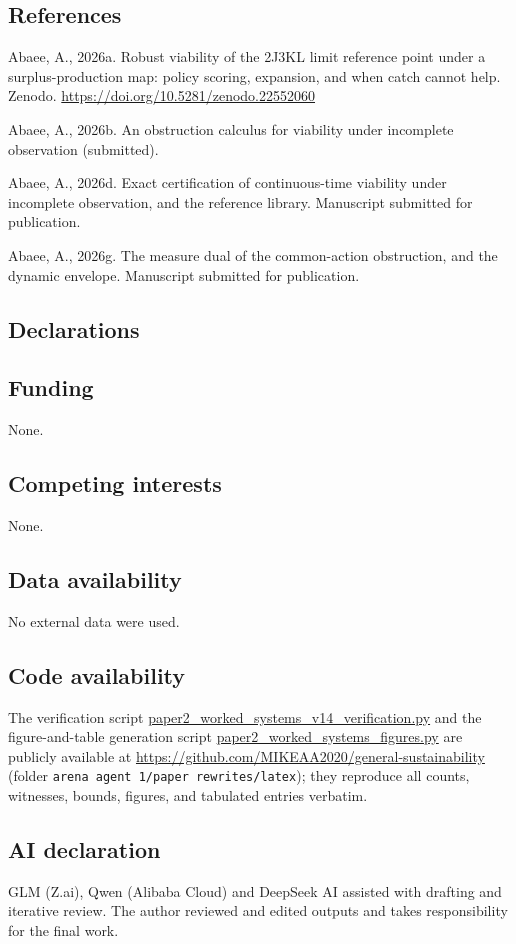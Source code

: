 \documentclass[10pt,twocolumn]{article}
\theoremstyle{definition}
\begin{document}
\subsection*{References}

Abaee, A., 2026a. Robust viability of the 2J3KL limit reference point
under a surplus-production map: policy scoring, expansion, and when
catch cannot help. Zenodo.
\url{https://doi.org/10.5281/zenodo.22552060}

Abaee, A., 2026b. An obstruction calculus for viability under
incomplete observation (submitted).

Abaee, A., 2026d. Exact certification of continuous-time viability under
incomplete observation, and the reference library. Manuscript submitted
for publication.

Abaee, A., 2026g. The measure dual of the common-action obstruction, and
the dynamic envelope. Manuscript submitted for publication.

\subsection*{Declarations}

\subsection*{Funding}
None.

\subsection*{Competing interests}
None.

\subsection*{Data availability}
No external data were used.

\subsection*{Code availability}
The verification script \url{paper2_worked_systems_v14_verification.py}
and the figure-and-table generation script
\url{paper2_worked_systems_figures.py} are publicly available at
\url{https://github.com/MIKEAA2020/general-sustainability} (folder
\texttt{arena agent 1/paper rewrites/latex}); they reproduce all
counts, witnesses, bounds, figures, and tabulated entries verbatim.

\subsection*{AI declaration}
GLM (Z.ai), Qwen (Alibaba Cloud) and DeepSeek AI assisted with drafting
and iterative review. The author reviewed and edited outputs and takes
responsibility for the final work.
\end{document}
